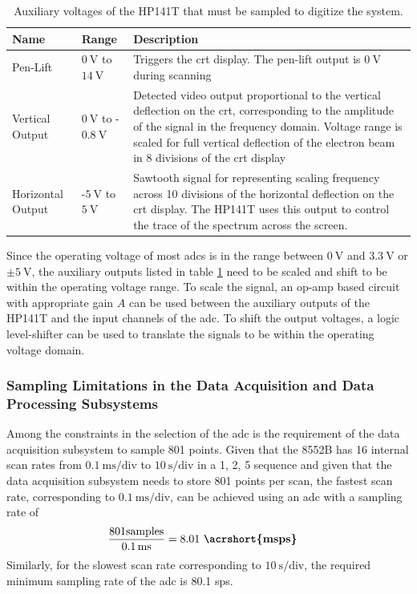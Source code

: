\documentclass[class=report,11pt,crop=false]{standalone}
\begin{document}
	\begin{table}[!ht]
		\centering
		\begin{tabular}{|m{5em}|m{8em}|m{25em}|}
			\hline
			\textbf{Name} & \textbf{Range} & \textbf{Description}\\
			\hline
			 Pen-Lift	&$\SI{0}{\volt}$ to $\SI{14}{\volt}$ & Triggers the \acrshort{crt} display. The pen-lift output is $\SI{0}{\volt}$ during scanning\\
			\hline
			Vertical Output	& $\SI{0}{\volt}$ to -$\SI{0.8}{\volt}$	& Detected video output proportional to the vertical deflection on the \acrshort{crt}, corresponding to the amplitude of the signal in the frequency domain. Voltage range is scaled for full vertical deflection of the electron beam in 8 divisions of the \acrshort{crt} display \\
			\hline
			 Horizontal Output	& -$\SI{5}{\volt}$ to $\SI{5}{\volt}$ & Sawtooth signal for representing scaling frequency across 10 divisions of the horizontal deflection on the \acrshort{crt} display. The HP141T uses this output to control the trace of the spectrum across the screen. \\
			\hline
		\end{tabular}
		\label{tab:hp141t-output-voltages}
		\caption{Auxiliary voltages of the HP141T that must be sampled to digitize the system.}
	\end{table}

	Since the operating voltage of most \acrshort{adc}s is in the range between $\SI{0}{\volt}$ and $\SI{3.3}{\volt}$ or $\pm\SI{5}{\volt}$, the auxiliary outputs listed in table \ref{tab:hp141t-output-voltages} need to be scaled and shift to be within the operating voltage range. To scale the signal, an op-amp based circuit with appropriate gain $A$ can be used between the auxiliary outputs of the HP141T and the input channels of the \acrshort{adc}. To shift the output voltages, a logic level-shifter can be used to translate the signals to be within the operating voltage domain. 

	\subsubsection{Sampling Limitations in the Data Acquisition and Data Processing Subsystems}
		
	Among the constraints in the selection of the \acrshort{adc} is the requirement of the data acquisition subsystem to sample 801 points. Given that the 8552B has 16 internal scan rates from $\SI{0.1}{\milli\second}/\text{div}$ to $\SI{10}{\second}/\text{div}$ in a 1, 2, 5 sequence and given that the data acquisition subsystem needs to store 801 points per scan, the fastest scan rate, corresponding to $\SI{0.1}{\milli\second}/\text{div}$, can be achieved using an \acrshort{adc} with a sampling rate of 
	\begin{align}
		\frac{801\text{samples}}{\SI{0.1}{\milli\second}}	& = 8.01~\textbf{\acrshort{msps}}\nonumber
	\end{align}
	Similarly, for the slowest scan rate corresponding to $\SI{10}{\second}/\text{div}$, the required minimum sampling rate of the \acrshort{adc} is 80.1 \acrshort{sps}.
	
\end{document}
